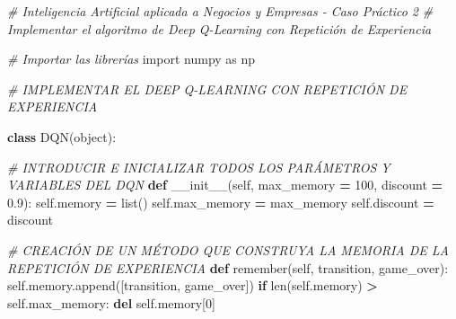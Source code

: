 \documentclass[
]{book}
\newenvironment{Shaded}{\begin{snugshade}}{\end{snugshade}}
\newcommand{\BuiltInTok}[1]{#1}
\newcommand{\CommentTok}[1]{\textcolor[rgb]{0.56,0.35,0.01}{\textit{#1}}}
\newcommand{\ControlFlowTok}[1]{\textcolor[rgb]{0.13,0.29,0.53}{\textbf{#1}}}
\newcommand{\DecValTok}[1]{\textcolor[rgb]{0.00,0.00,0.81}{#1}}
\newcommand{\FloatTok}[1]{\textcolor[rgb]{0.00,0.00,0.81}{#1}}
\newcommand{\FunctionTok}[1]{\textcolor[rgb]{0.00,0.00,0.00}{#1}}
\newcommand{\ImportTok}[1]{#1}
\newcommand{\KeywordTok}[1]{\textcolor[rgb]{0.13,0.29,0.53}{\textbf{#1}}}
\newcommand{\NormalTok}[1]{#1}
\newcommand{\OperatorTok}[1]{\textcolor[rgb]{0.81,0.36,0.00}{\textbf{#1}}}
\newcommand{\VariableTok}[1]{\textcolor[rgb]{0.00,0.00,0.00}{#1}}
\begin{document}
\begin{Shaded}
\begin{Highlighting}[]
\CommentTok{\# Inteligencia Artificial aplicada a Negocios y Empresas {-} Caso Práctico 2}
\CommentTok{\# Implementar el algoritmo de Deep Q{-}Learning con Repetición de Experiencia}

\CommentTok{\# Importar las librerías}
\ImportTok{import}\NormalTok{ numpy }\ImportTok{as}\NormalTok{ np}

\CommentTok{\# IMPLEMENTAR EL DEEP Q{-}LEARNING CON REPETICIÓN DE EXPERIENCIA}

\KeywordTok{class}\NormalTok{ DQN(}\BuiltInTok{object}\NormalTok{):}
    
    \CommentTok{\# INTRODUCIR E INICIALIZAR TODOS LOS PARÁMETROS Y VARIABLES DEL DQN}
    \KeywordTok{def} \FunctionTok{\_\_init\_\_}\NormalTok{(}\VariableTok{self}\NormalTok{, max\_memory }\OperatorTok{=} \DecValTok{100}\NormalTok{, discount }\OperatorTok{=} \FloatTok{0.9}\NormalTok{):}
        \VariableTok{self}\NormalTok{.memory }\OperatorTok{=} \BuiltInTok{list}\NormalTok{()}
        \VariableTok{self}\NormalTok{.max\_memory }\OperatorTok{=}\NormalTok{ max\_memory}
        \VariableTok{self}\NormalTok{.discount }\OperatorTok{=}\NormalTok{ discount}

    \CommentTok{\# CREACIÓN DE UN MÉTODO QUE CONSTRUYA LA MEMORIA DE LA REPETICIÓN DE EXPERIENCIA}
    \KeywordTok{def}\NormalTok{ remember(}\VariableTok{self}\NormalTok{, transition, game\_over):}
        \VariableTok{self}\NormalTok{.memory.append([transition, game\_over])}
        \ControlFlowTok{if} \BuiltInTok{len}\NormalTok{(}\VariableTok{self}\NormalTok{.memory) }\OperatorTok{\textgreater{}} \VariableTok{self}\NormalTok{.max\_memory:}
            \KeywordTok{del} \VariableTok{self}\NormalTok{.memory[}\DecValTok{0}\NormalTok{]}


\end{Highlighting}
\end{Shaded}
\end{document}
